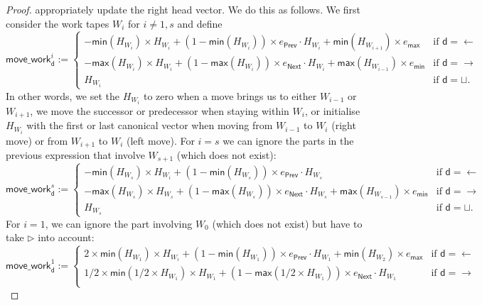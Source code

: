 \begin{proof}
    appropriately update the right head vector. We do this as follows. We first consider the work tapes 
    $W_i$ for $i\neq 1,s$ and define
    $$
    \mathsf{move\_work}^i_{\mathsf{d}}:=
    \begin{cases}
        -\mathsf{min}(H_{W_i})\times H_{W_i} + (1-\mathsf{min}(H_{W_i}))\times e_{\mathsf{Prev}}\cdot H_{W_i} + \mathsf{min}(H_{W_{i+1}})\times e_{\mathsf{max}} & \text{if $\mathsf{d}=\leftarrow$}\\
            -\mathsf{max}(H_{W_i})\times H_{W_i} + (1-\mathsf{max}(H_{W_i}))\times e_{\mathsf{Next}}\cdot H_{W_i} + \mathsf{max}(H_{W_{i-1}})\times e_{\mathsf{min}} & \text{if $\mathsf{d}=\rightarrow$}\\
        H_{W_i} & \text{if $\mathsf{d}=\sqcup$}. 	
    \end{cases}
    $$
    In other words, we set the $H_{W_i}$ to zero when a move brings us to either $W_{i-1}$ or $W_{i+1}$, we
    move the successor or predecessor when staying within $W_i$, or initialise $H_{W_i}$ with the first or 
    last canonical vector when moving from $W_{i-1}$ to $W_i$ (right move) or from $W_{i+1}$ to $W_i$ (left move).
    For $i=s$ we can ignore the parts in the previous expression that involve $W_{s+1}$ (which does not exist):
    $$
    \mathsf{move\_work}^s_{\mathsf{d}}:=
    \begin{cases}
        -\mathsf{min}(H_{W_s})\times H_{W_i} + (1-\mathsf{min}(H_{W_s}))\times e_{\mathsf{Prev}}\cdot H_{W_s}  & \text{if $\mathsf{d}=\leftarrow$}\\
            -\mathsf{max}(H_{W_s}) \times H_{W_s} + (1-\mathsf{max}(H_{W_s}))\times e_{\mathsf{Next}}\cdot H_{W_s} + \mathsf{max}(H_{W_{s-1}})\times e_{\mathsf{min}} & \text{if $\mathsf{d}=\rightarrow$}\\
        H_{W_s} & \text{if $\mathsf{d}=\sqcup$}. 	
    \end{cases}
    $$
    For $i=1$, we can ignore the part involving $W_{0}$ (which does not exist) but have to take $\rhd$ 
    into account:
    $$
    \mathsf{move\_work}^1_{\mathsf{d}}:=
    \begin{cases}
        2\times \mathsf{min}(H_{W_1})\times H_{W_i} + (1-\mathsf{min}(H_{W_1}))\times e_{\mathsf{Prev}}\cdot H_{W_1} + \mathsf{min}(H_{W_{2}})\times e_{\mathsf{max}} & \text{if $\mathsf{d}=\leftarrow$}\\
            1/2\times\mathsf{min}(1/2\times H_{W_1})\times H_{W_1} + (1-\mathsf{max}(1/2\times H_{W_1}))\times e_{\mathsf{Next}}\cdot H_{W_1}  & \text{if $\mathsf{d}=\rightarrow$}\\

\end{cases}$$
\end{proof}
